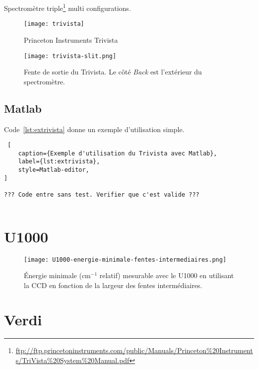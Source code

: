 \documentclass[11pt,francais]{book} %
\begin{document}
Spectromètre triple\footnote{\url{ftp://ftp.princetoninstruments.com/public/Manuals/Princeton\%20Instruments/TriVista\%20System\%20Manual.pdf}} multi configurations.

\begin{figure}[htbp]
\centering\texttt{[image: trivista]}
\caption{Princeton Instruments Trivista}
\label{fig:trivista}
\end{figure}

\begin{figure}[htbp]
\centering\texttt{[image: trivista-slit.png]}
\caption{Fente de sortie du Trivista. Le côté {\it Back} est l'extérieur du spectromètre.}
\label{fig:trivista-slit}
\end{figure}

\subsection{Matlab}

Code~\ref{lst:extrivista} donne un exemple d'utilisation simple.

\begin{lstlisting} [
    caption={Exemple d'utilisation du Trivista avec Matlab},
    label={lst:extrivista},
    style=Matlab-editor,
]

??? Code entre sans test. Verifier que c'est valide ???
  
\end{lstlisting}



\section{U1000}


\begin{figure}[htbp]
\centering\texttt{[image: U1000-energie-minimale-fentes-intermediaires.png]}
\caption{Énergie minimale (cm$^{-1}$ relatif) mesurable avec le U1000 en utilisant la CCD en fonction de la largeur des fentes intermédiaires.}
\label{fig:u1000-energie-minimale-raman}
\end{figure}


\section{Verdi}
\end{document}
